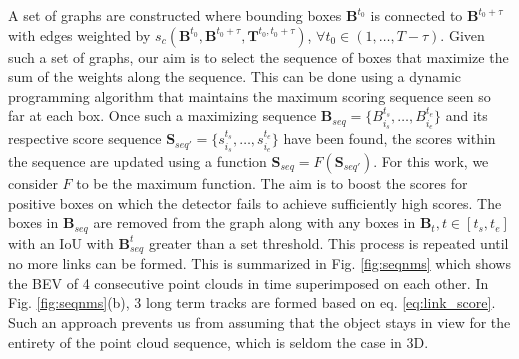 \documentclass[10pt,twocolumn,letterpaper]{article}
\begin{document}
A set of graphs are constructed where bounding boxes $\mathbf{B}^{t_0}$ is connected to $\mathbf{B}^{t_0+\tau}$ with edges weighted by $s_c(\mathbf{B}^{t_0}, \mathbf{B}^{t_0+\tau}, \mathbf{T}^{t_0,t_0+\tau})$, $\forall t_0\in(1, \ldots,T-\tau)$. Given such a set of graphs, our aim is to select the sequence of boxes that maximize the sum of the weights along the sequence. This can be done using a dynamic programming algorithm that maintains the maximum scoring sequence seen so far at each box. Once such a maximizing sequence $\mathbf{B}_{seq} = \{B_{i_s}^{t_s}, \ldots, B_{i_e}^{t_e}\}$ and its respective score sequence $\mathbf{S}_{seq'} = \{s_{i_s}^{t_s}, \ldots, s_{i_e}^{t_e}\}$ have been found, the scores within the sequence are updated using a function $\mathbf{S}_{seq} = F(\mathbf{S}_{seq'})$. For this work, we consider $F$ to be the maximum function. The aim is to boost the scores for positive boxes on which the detector fails to achieve sufficiently high scores. The boxes in $\mathbf{B}_{seq}$ are removed from the graph along with any boxes in $\mathbf{B}_t, t\in [t_s, t_e]$ with an IoU with $\mathbf{B}_{seq}^t$ greater than a set threshold. This process is repeated until no more links can be formed. This is summarized in Fig. \ref{fig:seqnms} which shows the BEV of 4 consecutive point clouds in time superimposed on each other. In Fig. \ref{fig:seqnms}(b), 3 long term tracks are formed based on eq. \ref{eq:link_score}. Such an approach prevents us from assuming that the object stays in view for the entirety of the point cloud sequence, which is seldom the case in 3D.
\end{document}
